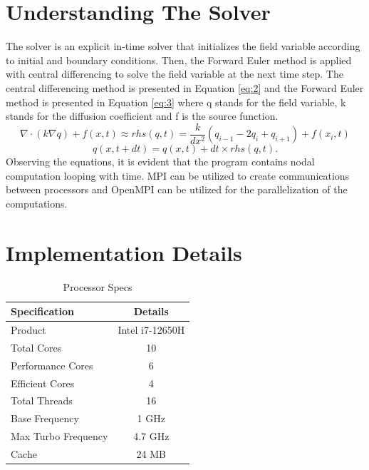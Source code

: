 \documentclass[12pt]{article}
\begin{document}
\section{Understanding The Solver}
\label{sec:2}
 The solver is an explicit in-time solver that initializes the field variable according to initial and boundary conditions. Then, the Forward Euler method is applied with central differencing to solve the field variable at the next time step. The central differencing method is presented in Equation \ref{eq:2} and the Forward Euler method is presented in Equation \ref{eq:3} where q stands for the field variable, k stands for the diffusion coefficient and f is the source function.
 \begin{equation}
 \label{eq:2}
\nabla \cdot (k\nabla q) + f(x, t) \approx rhs(q, t) = \frac{k}{dx^2} (q_{i-1} - 2q_i + q_{i+1}) + f(x_i, t)
\end{equation}
\begin{equation}
\label{eq:3}
    q(x, t + dt) = q(x, t) + dt \times {rhs}(q, t).
\end{equation}
Observing the equations, it is evident that the program contains nodal computation looping with time. MPI can be utilized to create communications between processors and OpenMPI can be utilized for the parallelization of the computations.
\section{Implementation Details}
\begin{table}[H]
\centering
\caption{Processor Specs}
\begin{tabular}{lc}
\toprule
\textbf{Specification} & \textbf{Details} \\
\midrule
Product & Intel i7-12650H \\
Total Cores & 10 \\
Performance Cores & 6 \\
Efficient Cores & 4 \\
Total Threads & 16 \\
Base Frequency & 1 GHz\\
Max Turbo Frequency & 4.7 GHz \\
Cache & 24 MB \\
\bottomrule
\end{tabular}
\end{table}
\end{document}
